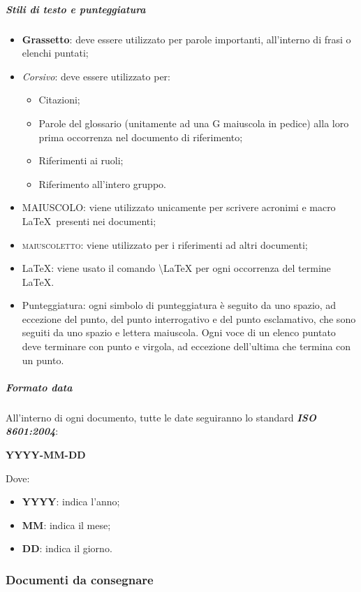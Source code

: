 				\subparagraph{Stili di testo e punteggiatura}
				\begin{itemize}
					\item \textbf{Grassetto}: deve essere utilizzato per parole importanti, all’interno di frasi o elenchi puntati;
					\item \textit{Corsivo}: deve essere utilizzato per:
					\begin{itemize}
						\item Citazioni;
						\item Parole del glossario (unitamente ad una G maiuscola in pedice) alla loro prima occorrenza nel documento di riferimento;
						\item Riferimenti ai ruoli;
						\item Riferimento all'intero gruppo.
					\end{itemize}
					\item MAIUSCOLO: viene utilizzato unicamente per scrivere acronimi e macro \LaTeX\ presenti nei documenti;
					\item \textsc{maiuscoletto}: viene utilizzato per i riferimenti ad altri documenti;
					\item \LaTeX: viene usato il comando \textbackslash{LaTeX} per ogni occorrenza del termine \LaTeX.
					\item Punteggiatura: ogni simbolo di punteggiatura è seguito da uno spazio, ad eccezione del punto, del punto interrogativo e del punto esclamativo, che sono seguiti da uno spazio e lettera maiuscola. Ogni voce di un elenco puntato deve terminare con punto e virgola, ad eccezione dell'ultima che termina con un punto. 
					\end{itemize}
	
				\subparagraph{Formato data}
				All'interno di ogni documento, tutte le date seguiranno lo standard \textit{\textbf{ISO 8601:2004}}:
				\begin{center}
					\textbf{YYYY-MM-DD}
				\end{center}
				Dove:
				\begin{itemize}
					\item \textbf{YYYY}: indica l'anno;
					\item \textbf{MM}: indica il mese;
					\item \textbf{DD}: indica il giorno.
				\end{itemize}
		
		\subsubsection{Documenti da consegnare}
